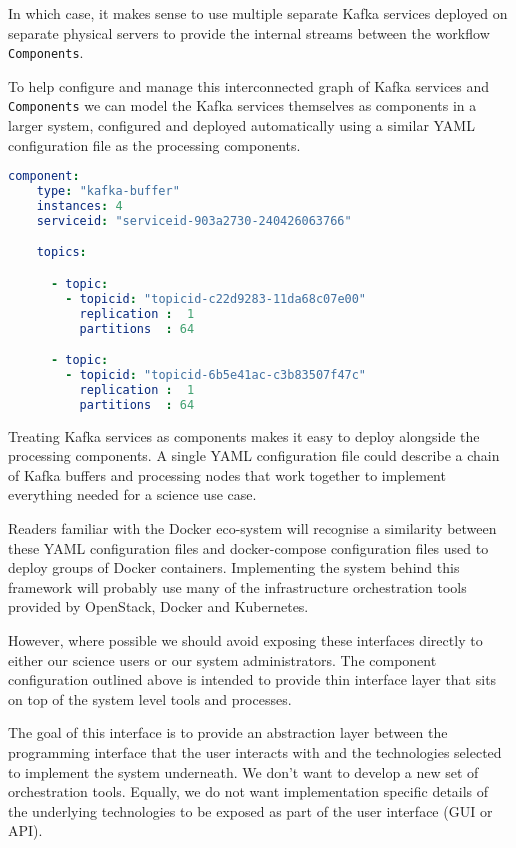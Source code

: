 \documentclass{article}
\newcommand{\yaml} {YAML\xspace}
\newcommand{\docker} {Docker\xspace}
\newcommand{\dockercompose} {docker-compose\xspace}
\newcommand{\openstack} {OpenStack\xspace}
\newcommand{\kafka} {Kafka\xspace}
\newcommand{\kubernetes} {Kubernetes\xspace}
\begin{document}
In which case, it makes sense to use multiple separate \kafka services deployed on separate physical servers to provide the internal streams between the workflow \texttt{Components}.

To help configure and manage this interconnected graph of \kafka services and \texttt{Components} we can model the \kafka services themselves as components in a larger system, configured and deployed automatically using a similar \yaml configuration file as the processing components.

\begin{lstlisting}[language=yaml]
  component:
    type: "kafka-buffer"
    instances: 4
    serviceid: "serviceid-903a2730-240426063766"

    topics:

      - topic:
        - topicid: "topicid-c22d9283-11da68c07e00"
          replication :  1
          partitions  : 64

      - topic:
        - topicid: "topicid-6b5e41ac-c3b83507f47c"
          replication :  1
          partitions  : 64
\end{lstlisting}

Treating \kafka services as components makes it easy to deploy alongside the processing components. A single \yaml configuration file could describe a chain of \kafka buffers and processing nodes that work together to implement everything needed for a science use case.

Readers familiar with the \docker eco-system will recognise a similarity between these \yaml configuration files and \dockercompose configuration files used to deploy groups of \docker containers.
Implementing the system behind this framework will probably use many of the infrastructure orchestration tools provided by \openstack, \docker and \kubernetes.

However, where possible we should avoid exposing these interfaces directly to either our science users or our system administrators. The component configuration outlined above is intended to provide thin interface layer that sits on top of the system level tools and processes.

The goal of this interface is to provide an abstraction layer between the programming interface that the user interacts with and the technologies selected to implement the system underneath. We don't want to develop a new set of orchestration tools. Equally, we do not want implementation specific details of the underlying technologies to be exposed as part of the user interface (GUI or API).
\end{document}
